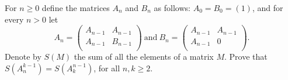 For $ n\geq 0$ define the matrices $ A_n$ and $ B_n$ as follows: $ A_0 = B_0 = (1)$, and for every $ n>0$ let
\[ A_n = \left( \begin{array}{cc} A_{n - 1} & A_{n - 1} \\
A_{n - 1} & B_{n - 1} \\
\end{array} \right) \ \textrm{and} \ B_n = \left( \begin{array}{cc} A_{n - 1} & A_{n - 1} \\
A_{n - 1} & 0 \\
\end{array} \right).
\]
Denote by $ S(M)$ the sum of all the elements of a matrix $ M$. Prove that $ S(A_n^{k - 1}) = S(A_k^{n - 1})$, for all $ n,k\geq 2$.
